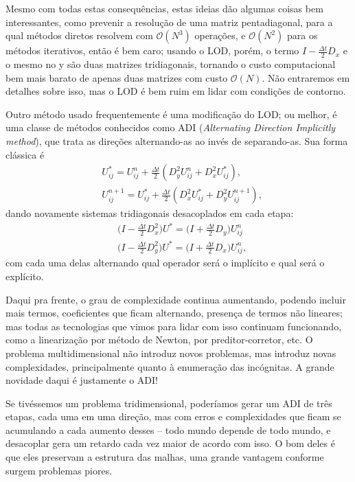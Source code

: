 \documentclass[../differential_methods.tex]{subfiles}
\begin{document}
Mesmo com todas estas consequências, estas ideias dão algumas coisas bem interessantes, como prevenir a resolução de uma matriz pentadiagonal, para a qual métodos diretos resolvem com \(\mathcal{O}(N^{3})\) operações, e \(\mathcal{O}(N^{2})\) para os métodos iterativos, então é bem caro; usando o LOD, porém, o termo \(I-\frac{\Delta t}{2}D_{x}\) e o mesmo no y são duas matrizes tridiagonais, tornando o custo computacional bem mais barato de apenas duas matrizes com custo \(\mathcal{O}(N)\).
Não entraremos em detalhes sobre isso, mas o LOD é bem ruim em lidar com condições de contorno.

Outro método usado frequentemente é uma modificação do LOD; ou melhor, é uma classe de métodos conhecidos como ADI (\textit{Alternating Direction Implicitly method}), que trata as direções alternando-as ao invés de separando-as. Sua forma clássica é
\begin{align*}
	 & U_{ij}^{*} = U_{ij}^{n} + \frac{\Delta t}{2}(D_{y}^{2}U_{ij}^{n} + D_{x}^{2}U_{ij}^{*}),      \\
	 & U_{ij}^{n+1} = U_{ij}^{*} + \frac{\Delta t}{2}(D_{x}^{2} U_{ij}^{*} + D_{y}^{2}U_{ij}^{n+1}),
\end{align*}
dando novamente sistemas tridiagonais desacoplados em cada etapa:
\begin{align*}
	 & \biggl(I - \frac{\Delta t}{2}D_{x}^{2}\biggr)U^{*} = \biggl(I + \frac{\Delta t}{2}D_{y}\biggr)U_{ij}^{n}  \\
	 & \biggl(I - \frac{\Delta t}{2}D_{y}^{2}\biggr)U^{*} = \biggl(I + \frac{\Delta t}{2}D_{x}\biggr)U_{ij}^{n},
\end{align*}
com cada uma delas alternando qual operador será o implícito e qual será o explícito.

Daqui pra frente, o grau de complexidade continua aumentando, podendo incluir mais termos, coeficientes que ficam alternando, presença de termos não lineares; mas todas as tecnologias que vimos para lidar com isso continuam funcionando, como a linearização por método de Newton, por preditor-corretor, etc. O problema multidimensional não introduz novos problemas, mas introduz novas complexidades, principalmente quanto à enumeração das incógnitas.
A grande novidade daqui é justamente o ADI!

Se tivéssemos um problema tridimensional, poderíamos gerar um ADI de três etapas, cada uma em uma direção, mas com erros e complexidades que ficam se acumulando a cada aumento desses -- todo mundo depende de todo mundo, e desacoplar gera um retardo cada vez maior de acordo com isso. O bom deles é que eles preservam a estrutura das malhas, uma grande vantagem conforme surgem problemas piores.
\end{document}
